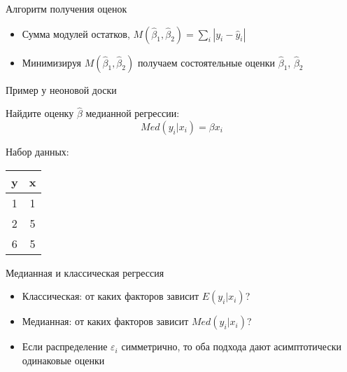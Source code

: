 \documentclass[ignorenonframetext,]{beamer}
\newcommand{\e}{\varepsilon}
\newcommand{\hy}{\hat{y}}
\newcommand{\hb}{\hat{\beta}}
\begin{document}
\begin{frame}{Алгоритм получения оценок}

\begin{itemize}
\item
  Сумма модулей остатков, \(M(\hb_1,\hb_2)=\sum_i |y_i - \hy_i|\)
\item
  Минимизируя \(M(\hb_1,\hb_2)\) получаем состоятельные оценки
  \(\hb_1\), \(\hb_2\)
\end{itemize}

\end{frame}

\begin{frame}{Пример у неоновой доски}

Найдите оценку \(\hb\) медианной регрессии: \[
Med(y_i|x_i)=\beta x_i
\]

Набор данных:

\begin{longtable}[c]{@{}cc@{}}
\toprule
\begin{minipage}[b]{0.05\columnwidth}\centering\strut
y
\strut\end{minipage} &
\begin{minipage}[b]{0.05\columnwidth}\centering\strut
x
\strut\end{minipage}\tabularnewline
\midrule
\endhead
\begin{minipage}[t]{0.05\columnwidth}\centering\strut
1
\strut\end{minipage} &
\begin{minipage}[t]{0.05\columnwidth}\centering\strut
1
\strut\end{minipage}\tabularnewline
\begin{minipage}[t]{0.05\columnwidth}\centering\strut
2
\strut\end{minipage} &
\begin{minipage}[t]{0.05\columnwidth}\centering\strut
5
\strut\end{minipage}\tabularnewline
\begin{minipage}[t]{0.05\columnwidth}\centering\strut
6
\strut\end{minipage} &
\begin{minipage}[t]{0.05\columnwidth}\centering\strut
5
\strut\end{minipage}\tabularnewline
\bottomrule
\end{longtable}

\end{frame}

\begin{frame}{Медианная и классическая регрессия}

\begin{itemize}
\item
  Классическая: от каких факторов зависит \(E(y_i|x_i)\)?
\item
  Медианная: от каких факторов зависит \(Med(y_i|x_i)\)?
\item
  Если распределение \(\e_i\) симметрично, то оба подхода дают
  асимптотически одинаковые оценки
\end{itemize}

\end{frame}
\end{document}
